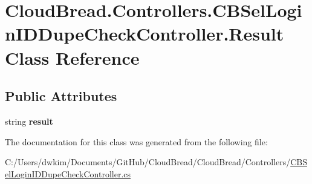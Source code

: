 \hypertarget{class_cloud_bread_1_1_controllers_1_1_c_b_sel_login_i_d_dupe_check_controller_1_1_result}{}\section{Cloud\+Bread.\+Controllers.\+C\+B\+Sel\+Login\+I\+D\+Dupe\+Check\+Controller.\+Result Class Reference}
\label{class_cloud_bread_1_1_controllers_1_1_c_b_sel_login_i_d_dupe_check_controller_1_1_result}
\subsection*{Public Attributes}
\begin{DoxyCompactItemize}
\item 
string {\bfseries result}\hypertarget{class_cloud_bread_1_1_controllers_1_1_c_b_sel_login_i_d_dupe_check_controller_1_1_result_aaa91f7ba629b20ebac3f83a65430b673}{}\label{class_cloud_bread_1_1_controllers_1_1_c_b_sel_login_i_d_dupe_check_controller_1_1_result_aaa91f7ba629b20ebac3f83a65430b673}

\end{DoxyCompactItemize}


The documentation for this class was generated from the following file\+:\begin{DoxyCompactItemize}
\item 
C\+:/\+Users/dwkim/\+Documents/\+Git\+Hub/\+Cloud\+Bread/\+Cloud\+Bread/\+Controllers/\hyperlink{_c_b_sel_login_i_d_dupe_check_controller_8cs}{C\+B\+Sel\+Login\+I\+D\+Dupe\+Check\+Controller.\+cs}\end{DoxyCompactItemize}

